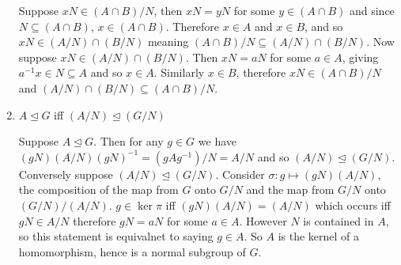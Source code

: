 \documentclass[12pt]{article}
\begin{document}
\begin{enumerate}
Suppose $xN\in (A\cap B)/N$, then $xN = yN$ for some $y\in (A\cap B)$ and since $N\subseteq (A\cap B)$, $x\in (A\cap B)$. Therefore $x\in A$ and $x\in B$, and so $xN\in (A/N)\cap (B/N)$ meaning $(A\cap B)/N\subseteq (A/N)\cap (B/N)$.
Now suppose $xN\in (A/N)\cap (B/N)$. Then $xN=aN$ for some $a\in A$, giving $a^{-1}x\in N \subseteq A$ and so $x\in A$. Similarly $x\in B$, therefore $xN\in (A\cap B)/N$ and $(A/N)\cap (B/N) \subseteq (A\cap B)/N$.

\item $A\unlhd G$ iff $(A/N)\unlhd (G/N)$

Suppose $A\unlhd G$. Then for any $g\in G$ we have $(gN)(A/N)(gN)^{-1}=(gAg^{-1})/N=A/N$ and so $(A/N)\unlhd (G/N)$.\\
Conversely suppose $(A/N)\unlhd (G/N)$. Consider $\sigma\colon g\mapsto (gN)(A/N)$, the composition of the map from $G$ onto $G/N$ and the map from $G/N$ onto $(G/N)/(A/N)$. $g\in \ker \pi$ iff $(gN)(A/N)=(A/N)$ which occurs iff $gN\in A/N$ therefore $gN=aN$ for some $a\in A$. However $N$ is contained in $A$, so this statement is equivalnet to saying $g\in A$. So $A$ is the kernel of a homomorphism, hence is a normal subgroup of $G$.
\end{enumerate}
\end{document}
